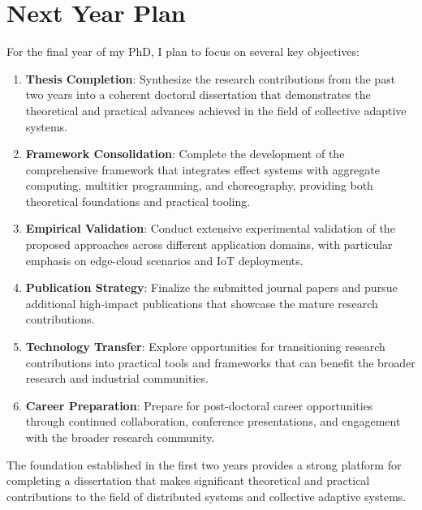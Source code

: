 \documentclass[runningheads]{llncs}
\begin{document}
\section{Next Year Plan}

For the final year of my PhD, I plan to focus on several key objectives:

\begin{enumerate}
\item \textbf{Thesis Completion}: Synthesize the research contributions from the past two years into a coherent doctoral dissertation that demonstrates the theoretical and practical advances achieved in the field of collective adaptive systems.

\item \textbf{Framework Consolidation}: Complete the development of the comprehensive framework that integrates effect systems with aggregate computing, multitier programming, and choreography, providing both theoretical foundations and practical tooling.

\item \textbf{Empirical Validation}: Conduct extensive experimental validation of the proposed approaches across different application domains, with particular emphasis on edge-cloud scenarios and IoT deployments.

\item \textbf{Publication Strategy}: Finalize the submitted journal papers and pursue additional high-impact publications that showcase the mature research contributions.

\item \textbf{Technology Transfer}: Explore opportunities for transitioning research contributions into practical tools and frameworks that can benefit the broader research and industrial communities.

\item \textbf{Career Preparation}: Prepare for post-doctoral career opportunities through continued collaboration, conference presentations, and engagement with the broader research community.
\end{enumerate}

The foundation established in the first two years provides a strong platform for completing a dissertation that makes significant theoretical and practical contributions to the field of distributed systems and collective adaptive systems.
\end{document}
